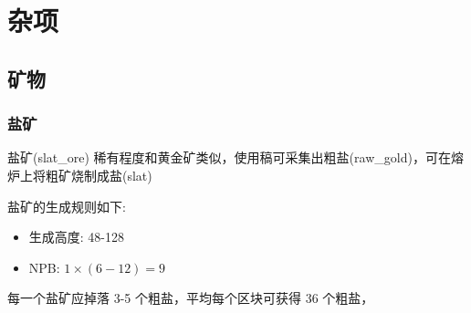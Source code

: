 \section{杂项}

\subsection{矿物}
\subsubsection{盐矿}

盐矿(slat\_ore) 稀有程度和黄金矿类似，使用稿可采集出粗盐(raw\_gold)，可在熔炉上将粗矿烧制成盐(slat)

盐矿的生成规则如下:
\begin{itemize}
    \item 生成高度: 48-128
    \item NPB: $1 \times (6-12) = 9$
\end{itemize}

每一个盐矿应掉落 3-5 个粗盐，平均每个区块可获得 36 个粗盐，